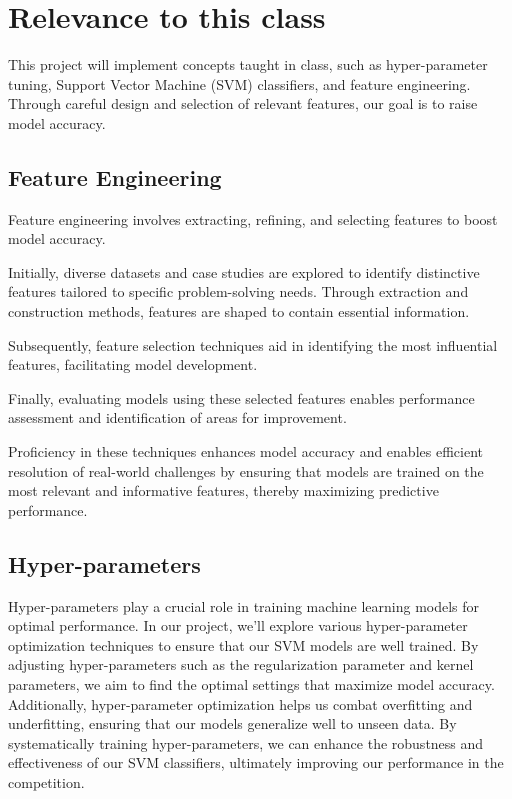 \documentclass{article}
\begin{document}
\section{Relevance to this class}
\label{headings}

This project will implement concepts taught in class, such as hyper-parameter tuning, Support Vector Machine (SVM) classifiers, and feature engineering. 
Through careful design and selection of relevant features, our goal is to raise model accuracy.

\subsection{Feature Engineering}
Feature engineering involves extracting, refining, and selecting features to boost model accuracy.

Initially, diverse datasets and case studies are explored to identify distinctive features tailored to specific problem-solving needs. Through extraction and construction methods, features are shaped to contain essential information.

Subsequently, feature selection techniques aid in identifying the most influential features, facilitating model development. 

Finally, evaluating models using these selected features enables performance assessment and identification of areas for improvement.

Proficiency in these techniques enhances model accuracy and enables efficient resolution of real-world challenges by ensuring that models are trained on the most relevant and informative features, thereby maximizing predictive performance.

\subsection{Hyper-parameters}
Hyper-parameters play a crucial role in training machine learning models for optimal performance. In our project, we'll explore various hyper-parameter optimization techniques to ensure that our SVM models are well trained. By adjusting hyper-parameters such as the regularization parameter and kernel parameters, we aim to find the optimal settings that maximize model accuracy.
Additionally, hyper-parameter optimization helps us combat overfitting and underfitting, ensuring that our models generalize well to unseen data. By systematically training hyper-parameters, we can enhance the robustness and effectiveness of our SVM classifiers, ultimately improving our performance in the competition.
\end{document}
